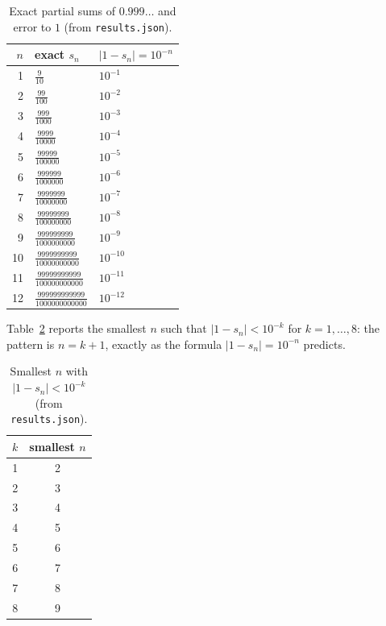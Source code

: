 \documentclass[11pt,a4paper]{article}
\begin{document}
\begin{table}[htbp]
\centering
\caption{Exact partial sums of $0.999\ldots$ and error to $1$
         (from \texttt{results.json}).}
\label{tab:partial}
\begin{tabular}{@{}rll@{}}
\toprule
$n$ & exact $s_n$ & $|1-s_n|=10^{-n}$ \\
\midrule
1 & $\frac{9}{10}$ & $10^{-1}$ \\
2 & $\frac{99}{100}$ & $10^{-2}$ \\
3 & $\frac{999}{1000}$ & $10^{-3}$ \\
4 & $\frac{9999}{10000}$ & $10^{-4}$ \\
5 & $\frac{99999}{100000}$ & $10^{-5}$ \\
6 & $\frac{999999}{1000000}$ & $10^{-6}$ \\
7 & $\frac{9999999}{10000000}$ & $10^{-7}$ \\
8 & $\frac{99999999}{100000000}$ & $10^{-8}$ \\
9 & $\frac{999999999}{1000000000}$ & $10^{-9}$ \\
10 & $\frac{9999999999}{10000000000}$ & $10^{-10}$ \\
11 & $\frac{99999999999}{100000000000}$ & $10^{-11}$ \\
12 & $\frac{999999999999}{1000000000000}$ & $10^{-12}$ \\
\bottomrule
\end{tabular}
\end{table}

Table~\ref{tab:threshold} reports the smallest $n$ such that
$|1-s_n|<10^{-k}$ for $k=1,\dots,8$: the pattern is $n=k+1$, exactly as the
formula $|1-s_n|=10^{-n}$ predicts.

\begin{table}[htbp]
\centering
\caption{Smallest $n$ with $|1-s_n|<10^{-k}$ (from \texttt{results.json}).}
\label{tab:threshold}
\begin{tabular}{@{}cc@{}}
\toprule
$k$ & smallest $n$ \\
\midrule
1 & 2 \\
2 & 3 \\
3 & 4 \\
4 & 5 \\
5 & 6 \\
6 & 7 \\
7 & 8 \\
8 & 9 \\
\bottomrule
\end{tabular}
\end{table}
\end{document}
